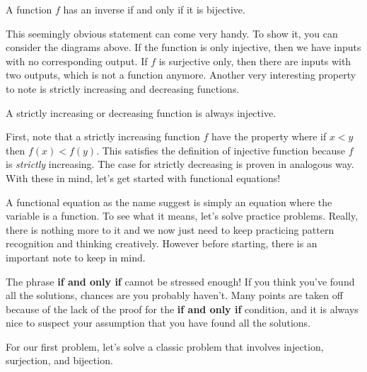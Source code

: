 \documentclass[../../main.tex]{subfiles}
\begin{document}
\begin{important}
A function $f$ has an inverse if and only if it is bijective.
\end{important}

This seemingly obvious statement can come very handy. To show it,
you can consider the diagrams above. If the function is only
injective, then we have inputs with no corresponding output.
If $f$ is surjective only, then there are inputs with two outputs,
which is not a function anymore. Another very interesting
property to note is strictly increasing and decreasing functions.

\begin{important}
A strictly increasing or decreasing function is always injective.
\end{important}

First, note that a strictly increasing function $f$ have the property
where if $x < y$ then $f(x) < f(y)$. This satisfies the definition
of injective function because $f$ is \textit{strictly} increasing.
The case for strictly decreasing is proven in analogous way.
With these in mind, let's get started with functional equations!

A functional equation as the name suggest is simply an equation
where the variable is a function. To see what it means, let's
solve practice problems. Really, there is nothing more to it
and we now just need to keep practicing pattern recognition and
thinking creatively. However before starting, there is an important
note to keep in mind.

\begin{important}
The phrase \textbf{if and only if} cannot be stressed enough!
If you think you've found all the solutions, chances are you
probably haven't. Many points are taken off because of the lack
of the proof for the \textbf{if and only if} condition, and it
is always nice to suspect your assumption that you have found all
the solutions.
\end{important}

For our first problem, let's solve a classic problem that involves
injection, surjection, and bijection.
\end{document}
